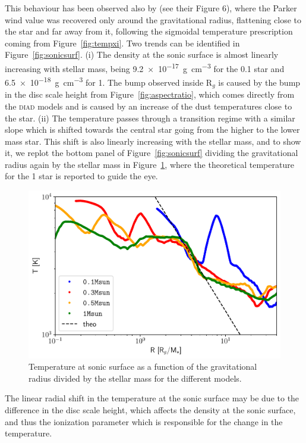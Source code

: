 \documentclass[usenatbib,useAMS,usedcolumn]{mnras}
\begin{document}
This behaviour has been observed also by  (see their Figure 6), where the Parker wind value was recovered only around the gravitational radius, flattening close to the star and far away from it, following the sigmoidal temperature prescription coming from Figure~\ref{fig:tempxi}.
Two trends can be identified in Figure~\ref{fig:sonicsurf}.
(i) The density at the sonic surface is almost linearly increasing with stellar mass, being \SI{9.2e-17}{g.cm^{-3}} for the \SI{0.1}{\solarmass} star and \SI{6.5e-18}{g.cm^{-3}} for \SI{1}{\solarmass}. The bump observed inside $\mathrm{R}_g$ is caused by the bump in the disc scale height from Figure~\ref{fig:aspectratio}, which comes directly from the \textsc{diad} models and is caused by an increase of the dust temperatures close to the star.
(ii) The temperature passes through a transition regime with a similar slope which is shifted towards the central star going from the higher to the lower mass star. This shift is also linearly increasing with the stellar mass, and to show it, we replot the bottom panel of Figure~\ref{fig:sonicsurf} dividing the gravitational radius again by the stellar mass in Figure~\ref{fig:sonicsurfrescaled}, where the theoretical temperature for the \SI{1}{\solarmass} star is reported to guide the eye.
\begin{figure}
    \centering
    \includegraphics[width=\columnwidth]{Figure10}
    \caption{Temperature at sonic surface as a function of the gravitational radius divided by the stellar mass for the different models. \label{fig:sonicsurfrescaled}}
\end{figure}
The linear radial shift in the temperature at the sonic surface may be due to the difference in the disc scale height, which affects the density at the sonic surface, and thus the ionization parameter which is responsible for the change in the temperature. 
\end{document}
